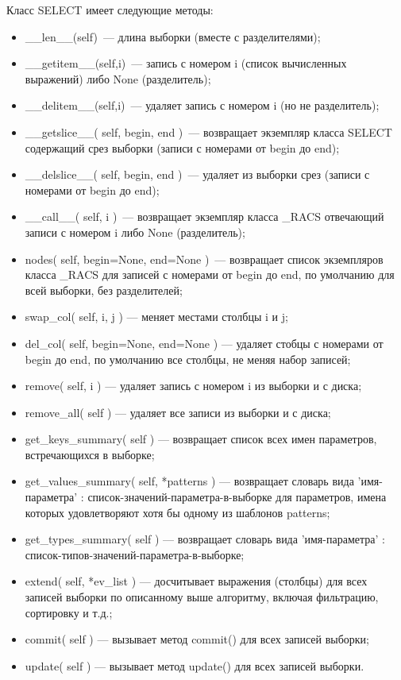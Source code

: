 Класс {\sf SELECT} имеет следующие методы:
\begin{itemize}
\item {\sf \_\_len\_\_(self)}~--- длина выборки (вместе с разделителями);
\item {\sf \_\_getitem\_\_(self,i)}~--- запись с номером {\sf i} (список
  вычисленных выражений) либо {\sf None} (разделитель);
\item {\sf \_\_delitem\_\_(self,i)}~--- удаляет запись с номером {\sf i} (но
  не разделитель);
\item {\sf \_\_getslice\_\_( self, begin, end )}~--- возвращает экземпляр
  класса {\sf SELECT} содержащий срез выборки (записи с номерами от {\sf
    begin} до  {\sf end});
\item {\sf \_\_delslice\_\_( self, begin, end )}~--- удаляет из выборки срез  (записи с номерами от {\sf
    begin} до  {\sf end});
\item {\sf \_\_call\_\_( self, i )}~--- возвращает экземпляр класса {\sf
  \_RACS} отвечающий записи с номером {\sf i} либо {\sf None} (разделитель);
\item {\sf nodes( self, begin=None, end=None )}~--- возвращает список экземпляров 
класса {\sf \_RACS} для записей с номерами от {\sf
    begin} до  {\sf end}, по умолчанию для всей выборки, без разделителей;
\item {\sf swap\_col( self, i, j )} --- меняет местами столбцы {\sf i} и  {\sf
j};
\item {\sf del\_col( self, begin=None, end=None )} --- удаляет стобцы с номерами от {\sf
    begin} до  {\sf end}, по умолчанию все столбцы, не меняя набор записей;
\item {\sf remove( self, i )} --- удаляет запись с номером {\sf i} из выборки
  и с диска;
\item {\sf remove\_all( self )} --- удаляет все записи из выборки и с диска;
\item {\sf get\_keys\_summary( self )} --- возвращает список всех имен
  параметров, встречающихся в выборке;
\item {\sf get\_values\_summary( self, *patterns )} --- возвращает словарь вида {\sf
  'имя-параметра' : список-значений-параметра-в-выборке} для параметров, имена
  которых удовлетворяют хотя бы одному из шаблонов {\sf patterns};
\item {\sf get\_types\_summary( self )} --- возвращает словарь вида {\sf
  'имя-параметра' : список-типов-значений-параметра-в-выборке};
\item {\sf extend( self, *ev\_list )} --- досчитывает выражения (столбцы)
  для всех записей выборки по описанному выше алгоритму, включая фильтрацию,
  сортировку и т.д.;
\item {\sf commit( self )} --- вызывает метод {\sf commit()} для всех записей выборки;
\item {\sf update( self )} --- вызывает метод {\sf update()} для всех записей выборки.
\end{itemize}



